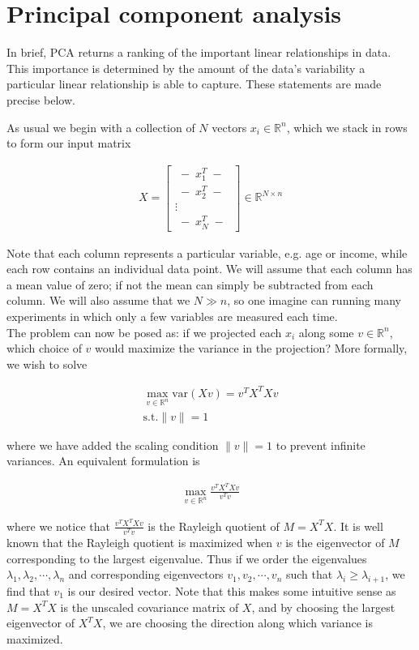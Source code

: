 \section{Principal component analysis\label{sec:ml:pca}}

In brief, PCA returns a ranking of the important linear relationships
in data. This importance is determined by the amount of the data's
variability a particular linear relationship is able to capture. These
statements are made precise below.

As usual we begin with a collection of $N$ vectors $x_i \in \mathbb{R}^n$,
which we stack in rows to form our input matrix

\begin{align}
  X = \begin{bmatrix} \; - \; x_1^T \; - \; \\ \; - \; x_2^T \; - \; \\ \vdots \\ \; - \; x_N^T
    \; - \; \end{bmatrix} \in \mathbb{R}^{N \times n}
\end{align}

Note that each column represents a particular variable, e.g. age or
income, while each row contains an individual data point. We will
assume that each column has a mean value of zero; if not the mean can
simply be subtracted from each column. We will also assume that we
$N \gg n$, so one imagine can running many experiments in which only a
few variables are measured each time. \\

The problem can now be posed
as: if we projected each $x_i$ along some $v \in \mathbb{R}^n$, which
choice of $v$ would maximize the variance in the projection? More
formally, we wish to solve

\begin{align}
  \max_{v \in \mathbb{R}^n} \mathrm{var}(Xv) = v^TX^TXv \\
  \mathrm{s.t.} \| v \| = 1
\end{align}

where we have added the scaling condition $\| v \| = 1$ to prevent
infinite variances. An equivalent formulation is 

\begin{align}
  \max_{v \in \mathbb{R}^n} \frac{v^TX^TXv}{v^Tv}
\end{align}

where we notice that $\frac{v^TX^TXv}{v^Tv}$ is the Rayleigh quotient
of $M = X^TX$. It is well known that the Rayleigh quotient is
maximized when $v$ is the eigenvector of $M$ corresponding to the
largest eigenvalue. Thus if we order the eigenvalues
$\lambda_1, \lambda_2, \cdots, \lambda_n$ and corresponding
eigenvectors $v_1, v_2, \cdots, v_n$ such that
$\lambda_i \ge \lambda_{i+1}$, we find that $v_1$ is our desired
vector. Note that this makes some intuitive sense as $M = X^TX$ is the
unscaled covariance matrix of $X$, and by choosing the largest
eigenvector of $X^TX$, we are choosing the direction along which
variance is maximized. \\

